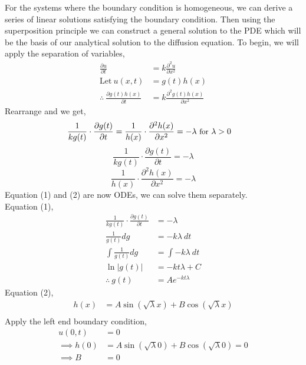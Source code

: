 \documentclass{article}
\begin{document}
For the systems where the boundary condition is homogeneous, we can derive a series of linear solutions satisfying the boundary condition. Then using the superposition principle we can construct a general solution to the PDE which will be the basis of our analytical solution to the diffusion equation. To begin, we will apply the separation of variables,
\[
	\begin{split}
		\frac{\partial u}{\partial t} &= k\frac{\partial^2 u}{\partial x^2} \\
		\text{Let} \ u(x, t) &= g(t)h(x) \\
		\therefore \ \frac{\partial g(t)h(x)}{\partial t} &= k\frac{\partial^2 g(t)h(x)}{\partial x^2}
	\end{split}
\]
Rearrange and we get,
\[
	\begin{split}
		\frac{1}{kg(t)} \cdot \frac{\partial g(t)}{\partial t} &= \frac{1}{h(x)}\cdot \frac{\partial^2 h(x)}{\partial x^2} = -\lambda \ \text{\small for} \ \lambda > 0
	\end{split}
\]
\begin{equation}
\label{eq:a}
\frac{1}{kg(t)} \cdot \frac{\partial g(t)}{\partial t} = -\lambda
\end{equation}
\begin{equation}
\label{eq:b}
\frac{1}{h(x)}\cdot \frac{\partial^2 h(x)}{\partial x^2} = -\lambda
\end{equation}
Equation (1) and (2) are now ODEs, we can solve them separately.
\\
Equation (1),
\[
	\begin{split}
		\frac{1}{kg(t)} \cdot \frac{\partial g(t)}{\partial t} &= -\lambda \\
		\frac{1}{g(t)}dg &= -k\lambda \ dt \\
		\int \frac{1}{g(t)}dg &= \int -k\lambda \ dt \\
		\ln|g(t)| &= -kt\lambda + C \\
		\therefore \ g(t) &= Ae^{-kt\lambda}
	\end{split}
\]
Equation (2),
\[
	\begin{split}
		h(x) &= A\sin{(\sqrt{\lambda}x)} + B\cos{(\sqrt{\lambda}x)} \\
	\end{split}
\]
Apply the left end boundary condition,
\[
	\begin{split}
		u(0, t) &= 0 \\
		\implies h(0) &= A\sin{(\sqrt{\lambda}0)} + B\cos{(\sqrt{\lambda}0)} = 0 \\
		\implies B &= 0 \\
	\end{split}
\]
\end{document}
